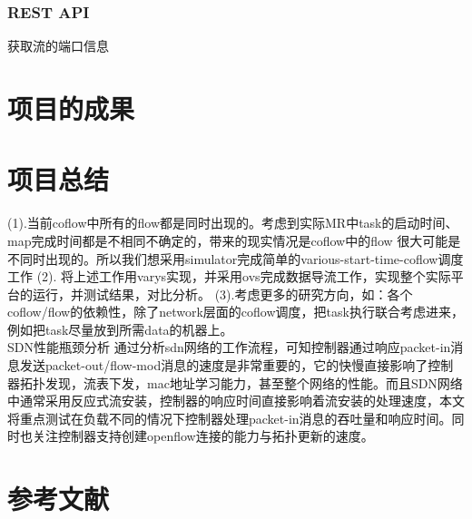 \documentclass[a4paper, 11pt]{article}                                                   %
\begin{document}
\begin{CJK*}{UTF8}{song}
\subsubsection{REST API}
获取流的端口信息

\section{项目的成果}

\section{项目总结}
(1).当前coflow中所有的flow都是同时出现的。考虑到实际MR中task的启动时间、map完成时间都是不相同不确定的，带来的现实情况是coflow中的flow 很大可能是不同时出现的。所以我们想采用simulator完成简单的various-start-time-coflow调度工作
(2). 将上述工作用varys实现，并采用ovs完成数据导流工作，实现整个实际平台的运行，并测试结果，对比分析。
(3).考虑更多的研究方向，如：各个coflow/flow的依赖性，除了network层面的coflow调度，把task执行联合考虑进来，例如把task尽量放到所需data的机器上。\\
SDN性能瓶颈分析
通过分析sdn网络的工作流程，可知控制器通过响应packet-in消息发送packet-out/flow-mod消息的速度是非常重要的，它的快慢直接影响了控制器拓扑发现，流表下发，mac地址学习能力，甚至整个网络的性能。而且SDN网络中通常采用反应式流安装，控制器的响应时间直接影响着流安装的处理速度，本文将重点测试在负载不同的情况下控制器处理packet-in消息的吞吐量和响应时间。同时也关注控制器支持创建openflow连接的能力与拓扑更新的速度。
\section{参考文献}






\end{CJK*}
\end{document}
